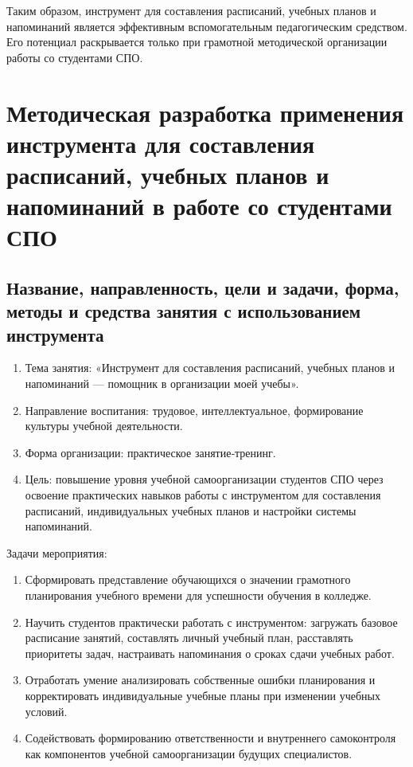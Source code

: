 \documentclass[14pt,a4paper]{article}
\begin{document}
Таким образом, инструмент для составления расписаний, учебных планов и напоминаний является эффективным вспомогательным педагогическим средством. Его потенциал раскрывается только при грамотной методической организации работы со студентами СПО.


\newpage
\section{Методическая разработка применения инструмента для составления расписаний, учебных планов и напоминаний в работе со студентами СПО}

\subsection{Название, направленность, цели и задачи, форма, методы и средства занятия с использованием инструмента}
\begin{enumerate}
    \item Тема занятия: «Инструмент для составления расписаний, учебных планов и напоминаний — помощник в организации моей учебы».
    \item Направление воспитания: трудовое, интеллектуальное, формирование культуры учебной деятельности.
    \item Форма организации: практическое занятие‑тренинг.
    \item Цель: повышение уровня учебной самоорганизации студентов СПО через освоение практических навыков работы с инструментом для составления расписаний, индивидуальных учебных планов и настройки системы напоминаний.
\end{enumerate}

Задачи мероприятия:
\begin{enumerate}
    \item Сформировать представление обучающихся о значении грамотного планирования учебного времени для успешности обучения в колледже.
    \item Научить студентов практически работать с инструментом: загружать базовое расписание занятий, составлять личный учебный план, расставлять приоритеты задач, настраивать напоминания о сроках сдачи учебных работ.
    \item Отработать умение анализировать собственные ошибки планирования и корректировать индивидуальные учебные планы при изменении учебных условий.
    \item Содействовать формированию ответственности и внутреннего самоконтроля как компонентов учебной самоорганизации будущих специалистов.
\end{enumerate}
\end{document}
